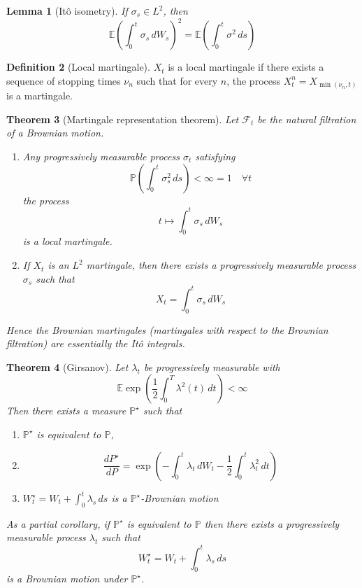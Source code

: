 \documentclass[10pt, oneside, reqno]{amsart}
\theoremstyle{plain}%
\newtheorem{thm}{Theorem}[section]
\newtheorem{lem}[thm]{Lemma}
\numberwithin{equation}{section}
\theoremstyle{definition}
\newtheorem{defn}[thm]{Definition}
\theoremstyle{remark}
\newcommand{\sigf}{\mathcal{F}}
\newcommand{\E}{\mathbb{E}}
\renewcommand{\P}{\mathbb{P}}
\begin{document}
\begin{lem}[It\^o isometry]
	If $\sigma_s \in L^2$, then \[
		\E(\int_0^t \sigma_s \, dW_s)^2 = \E(\int_0^t \sigma^2 \, ds)
	\]
\end{lem}

\begin{defn}[Local martingale]
	$X_t$ is a local martingale if there exists a sequence of stopping times $\nu_n$ such that for every $n$, the process $X^n_t = X_{\min(\nu_n, t)}$ is a martingale.  
\end{defn}

\begin{thm}[Martingale representation theorem]
	Let $\sigf_t$ be the natural filtration of a Brownian motion.  \begin{enumerate}
		\item Any progressively measurable process $\sigma_t$ satisfying \[\P(\int_0^t \sigma_s^2 \, ds) < \infty = 1 \quad \forall t \] the process \[
			t \mapsto \int_0^t \sigma_s \, dW_s
		\] is a local martingale. 
		\item If $X_t$ is an $L^2$ martingale, then there exists a progressively measurable process $\sigma_s$ such that \[
			X_t = \int_0^t \sigma_s \, dW_s
		\] 
	\end{enumerate}
	
	Hence the Brownian martingales (martingales with respect to the Brownian filtration) are essentially the It\^o integrals.
\end{thm}

\begin{thm}[Girsanov]
	Let $\lambda_t$ be progressively measurable with \[
		\E\exp(\frac{1}{2} \int_0^T \lambda^2(t) \, dt) < \infty
	\] Then there exists a measure $\P^\star$ such that \begin{enumerate}
		\item $\P^\star$ is equivalent to $\P$, 
		\item \[
		\frac{dP^\star}{dP} = \exp( - \int_0^t \lambda_t \, dW_t - \frac{1}{2} \int_0^t	\lambda^2_t \, dt )
		\]
		\item $W^\star_t = W_t + \int_0^t \lambda_s \, ds$ is a $\P^\star$-Brownian motion
	\end{enumerate} 
	
	As a partial corollary, if $\P^\star$ is equivalent to $\P$ then there exists a progressively measurable process $\lambda_t$ such that \[
		W^\star_t = W_t + \int_0^t \lambda_s \, ds
	\] is a Brownian motion under $\P^\star$.  
\end{thm}
\end{document}
